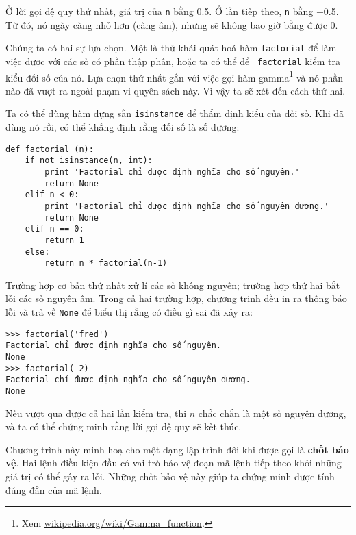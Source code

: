 \documentclass[11pt]{book}
\begin{document}

Ở lời gọi đệ quy thứ nhất, giá trị của {\tt n} bằng 0.5.
Ở lần tiếp theo, {\tt n} bằng $-$0.5. Từ đó, nó ngày càng nhỏ hơn 
(càng âm), nhưng sẽ không bao giờ bằng được 0.

Chúng ta có hai sự lựa chọn. Một là thử khái quát hoá hàm {\tt factorial}
để làm việc được với các số có phần thập phân, hoặc ta có thể để {\tt
  factorial} kiểm tra kiểu đối số của nó. Lựa chọn thứ nhất gắn với
việc gọi hàm gamma\footnote{Xem
  \url{wikipedia.org/wiki/Gamma_function}.} và nó phần nào đã vượt ra 
ngoài phạm vi quyên sách này. Vì vậy ta sẽ xét đến cách thứ hai.


Ta có thể dùng hàm dựng sẵn {\tt isinstance} để thẩm định kiểu
của đối số. Khi đã dùng nó rồi, có thể khẳng định rằng đối số là
số dương:


\beforeverb
\begin{verbatim}
def factorial (n):
    if not isinstance(n, int):
        print 'Factorial chỉ được định nghĩa cho số nguyên.'
        return None
    elif n < 0:
        print 'Factorial chỉ được định nghĩa cho số nguyên dương.'
        return None
    elif n == 0:
        return 1
    else:
        return n * factorial(n-1)
\end{verbatim}
\afterverb
%
Trường hợp cơ bản thứ nhất xử lí các số không nguyên;
trường hợp thứ hai bắt lỗi các số nguyên âm. Trong cả hai 
trường hợp, chương trinh đều in ra thông báo lỗi và trả về
{\tt None} để biểu thị rằng có điều gì sai đã xảy ra:

\beforeverb
\begin{verbatim}
>>> factorial('fred')
Factorial chỉ được định nghĩa cho số nguyên.
None
>>> factorial(-2)
Factorial chỉ được định nghĩa cho số nguyên dương.
None
\end{verbatim}
\afterverb
%
Nếu vượt qua được cả hai lần kiểm tra, thi $n$ chắc chắn là
một số nguyên dương, và ta có thể chứng minh rằng lời gọi
đệ quy sẽ kết thúc.


Chương trình này minh hoạ cho một dạng lập trình đôi khi được gọi là 
{\bf chốt bảo vệ}. Hai lệnh điều kiện đầu có vai trò bảo vệ đoạn mã lệnh
tiếp theo khỏi những giá trị có thể gây ra lỗi. Những chốt bảo vệ này
giúp ta chứng minh được tính đúng đắn của mã lệnh.
\end{document}
